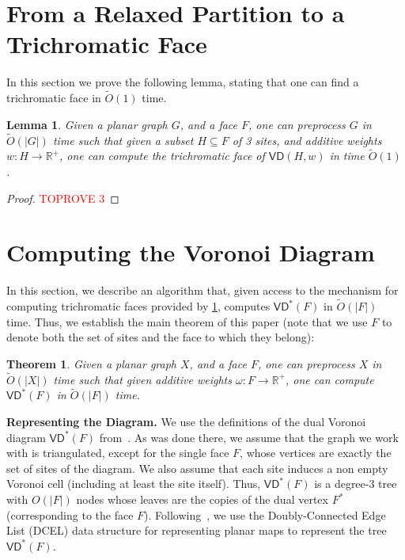 \documentclass{article}
\newcommand{\VD}{\textsf{VD}}
\newcommand{\X}{X}
\newtheorem{lemma}{Lemma}
\newtheorem{theorem}{Theorem}
\newcommand{\R}{\mathbb{R}}
\newcommand{\Otild}{\tilde{O}}
\begin{document}
\section{From a Relaxed Partition to a Trichromatic Face}\label{sec:partition_to_trichromatic}
In this section we prove the following lemma, stating that one can find a trichromatic face in $\Otild(1)$ time.

\begin{lemma}\label{lem:trichromatic}
    Given a planar graph $G$, and a face $F$, one can preprocess $G$ in $\Otild(|G|)$ time such that given a subset $H\subseteq F$ of 3 sites, and additive weights $w: H \rightarrow \R^+$, one can compute the trichromatic face of $\VD(H,w)$ in time $\Otild(1)$.
\end{lemma}
\begin{proof}\textcolor{red}{TOPROVE 3}\end{proof}

\section{Computing the Voronoi Diagram}\label{sec:computingVD}

In this section, we describe an algorithm that, given access to the mechanism for computing trichromatic faces provided by
\cref{lem:trichromatic}, computes $\VD^*(F)$ in $\Otild(|F|)$ time. Thus, we establish the main theorem of this paper (note that we use $F$ to denote both the set of sites and the face to which they belong):

\begin{theorem}\label{thm:main}
    Given a planar graph $\X$, and a face $F$, one can preprocess $\X$ in $\Otild(|\X|)$ time such that given  additive weights $\omega: F \rightarrow \R^+$, one can compute $\VD^*(F)$ in $\Otild(|F|)$ time.
\end{theorem}


\noindent
{\bf Representing the Diagram.}
We use the definitions of the dual Voronoi diagram $\VD^*(F)$ from~\cite{ourJACM}.
As was done there, we assume that the graph we work with is triangulated, except for the single face $F$, whose vertices are exactly the set of sites of the diagram. We also assume that each site induces a non empty Voronoi cell (including at least the site itself).
Thus, $\VD^*(F)$ is a degree-3 tree with $O(|F|)$ nodes whose leaves are the copies of the dual vertex $F^*$ (corresponding to the face $F$).
Following~\cite{DBLP:journals/siamcomp/GawrychowskiKMS21}, we use the Doubly-Connected Edge List (DCEL) data structure for representing planar maps to represent the tree $\VD^*(F)$.
\end{document}

